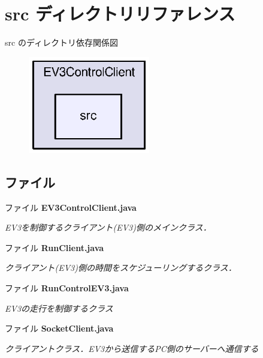 \section{src ディレクトリリファレンス}
\label{dir_c0af180523a0180a216dc9cc61d1804d}
src のディレクトリ依存関係図
\nopagebreak
\begin{figure}[H]
\begin{center}
\leavevmode
\includegraphics[width=151pt]{dir_c0af180523a0180a216dc9cc61d1804d_dep}
\end{center}
\end{figure}
\subsection*{ファイル}
\begin{DoxyCompactItemize}
\item 
ファイル {\bf E\-V3\-Control\-Client.\-java}
\begin{DoxyCompactList}\small\item\em E\-V3を制御するクライアント(\-E\-V3)側のメインクラス． \end{DoxyCompactList}\item 
ファイル {\bf Run\-Client.\-java}
\begin{DoxyCompactList}\small\item\em クライアント(\-E\-V3)側の時間をスケジューリングするクラス． \end{DoxyCompactList}\item 
ファイル {\bf Run\-Control\-E\-V3.\-java}
\begin{DoxyCompactList}\small\item\em E\-V3の走行を制御するクラス \end{DoxyCompactList}\item 
ファイル {\bf Socket\-Client.\-java}
\begin{DoxyCompactList}\small\item\em クライアントクラス．\-E\-V3から送信する\-P\-C側のサーバーへ通信する \end{DoxyCompactList}\end{DoxyCompactItemize}
